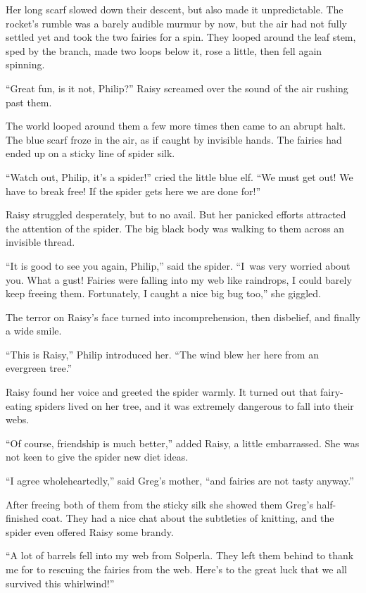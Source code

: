 \documentclass[10pt]{memoir}
\begin{document}
Her long scarf slowed down their descent, but also made it unpredictable. The
rocket's rumble was a barely audible murmur by now, but the air had not fully
settled yet and took the two fairies for a spin. They looped around the leaf
stem, sped by the branch, made two loops below it, rose a little, then fell
again spinning.

``Great fun, is it not, Philip?'' Raisy screamed over the sound of the air
rushing past them.

The world looped around them a few more times then came to an abrupt halt. The
blue scarf froze in the air, as if caught by invisible hands. The fairies had
ended up on a sticky line of spider silk.

``Watch out, Philip, it's a spider!'' cried the little blue elf. ``We must get
out! We have to break free! If the spider gets here we are done for!''

Raisy struggled desperately, but to no avail. But her panicked efforts
attracted the attention of the spider. The big black body was walking to them
across an invisible thread.

``It is good to see you again, Philip,'' said the spider. ``I~was very worried
about you. What a gust! Fairies were falling into my web like raindrops, I
could barely keep freeing them. Fortunately, I caught a nice big bug too,'' she
giggled.

The terror on Raisy's face turned into incomprehension, then disbelief, and
finally a wide smile.

``This is Raisy,'' Philip introduced her. ``The wind blew her here from an
evergreen tree.''

Raisy found her voice and greeted the spider warmly. It turned out that
fairy-eating spiders lived on her tree, and it was extremely dangerous to fall
into their webs.

``Of course, friendship is much better,'' added Raisy, a little embarrassed.
She was not keen to give the spider new diet ideas.

``I agree wholeheartedly,'' said Greg's mother, ``and fairies are not tasty
anyway.''

After freeing both of them from the sticky silk she showed them Greg's
half-finished coat. They had a nice chat about the subtleties of knitting, and
the spider even offered Raisy some brandy.

``A lot of barrels fell into my web from Solperla. They left them behind to
thank me for to rescuing the fairies from the web. Here's to the great luck
that we all survived this whirlwind!''
\end{document}
